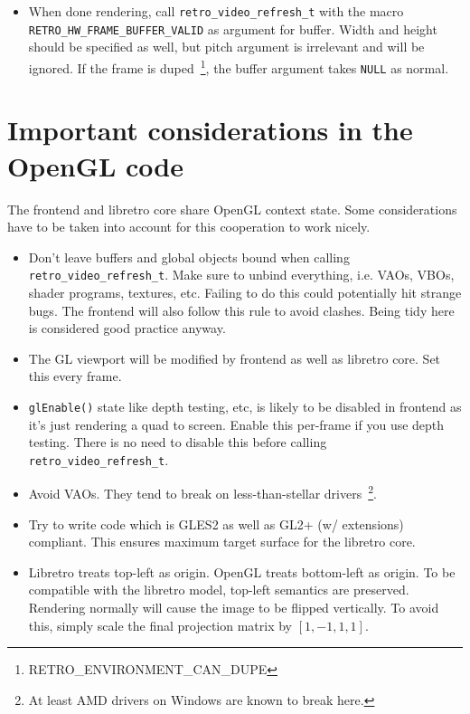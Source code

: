 \documentclass[11pt]{article}
\begin{document}
\begin{itemize}
\item When done rendering, call \texttt{retro\_video\_refresh\_t} with the macro \texttt{RETRO\_HW\_FRAME\_BUFFER\_VALID} as argument for buffer. Width and height should be specified as well, but pitch argument is irrelevant and will be ignored. If the frame is duped~\footnote{RETRO\_ENVIRONMENT\_CAN\_DUPE}, the buffer argument takes \texttt{NULL} as normal.
\end{itemize}

\section*{Important considerations in the OpenGL code}
The frontend and libretro core share OpenGL context state. Some considerations have to be taken into account for this cooperation to work nicely.

\begin{itemize}
\item Don't leave buffers and global objects bound when calling \\\texttt{retro\_video\_refresh\_t}.
Make sure to unbind everything, i.e. VAOs, VBOs, shader programs, textures, etc. Failing to do this could potentially hit strange bugs. The frontend will also follow this rule to avoid clashes. Being tidy here is considered good practice anyway.

\item The GL viewport will be modified by frontend as well as libretro core. Set this every frame.

\item \texttt{glEnable()} state like depth testing, etc, is likely to be disabled in frontend as it's just rendering a quad to screen. Enable this per-frame if you use depth testing.
There is no need to disable this before calling \\\texttt{retro\_video\_refresh\_t}.

\item Avoid VAOs. They tend to break on less-than-stellar drivers~\footnote{At least AMD drivers on Windows are known to break here.}.

\item Try to write code which is GLES2 as well as GL2+ (w/ extensions) compliant. This ensures maximum target surface for the libretro core.

\item Libretro treats top-left as origin. OpenGL treats bottom-left as origin. To be compatible with the libretro model, top-left semantics are preserved. Rendering normally will cause the image to be flipped vertically. To avoid this, simply scale the final projection matrix by $[1, -1, 1, 1]$.
\end{itemize}
\end{document}
